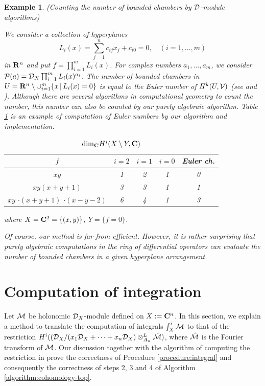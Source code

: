 \documentclass[12pt]{article}
\def\C{{\bf C}}
\def\R{ {\bf R}}
\def\Dsc{ {\cal D} }
\def\Msc{ {\cal M} }
\def\Psc{ {\cal P} }
\def\Vsc{ {\cal V} }
\newtheorem{example}{Example}[section]
\begin{document}
\begin{example} \rm 
(Counting the number of bounded chambers by $\Dsc$-module algorithms)

We consider a collection of hyperplanes
$$ L_i(x) = \sum_{j=1}^n c_{ij} x_j + c_{i0} = 0, \quad (i=1, \ldots, m)$$
in $\R^n$ and put $f = \prod_{i=1}^m L_i(x)$.
For complex numbers $a_1, \ldots, a_m$, we consider
$ \Psc(a) = \Dsc_X \prod_{i=1}^m L_i(x)^{a_i} $.
The number of bounded chambers in 
$U = \R^n \setminus \cup_{i=1}^m \{ x \,|\, L_i(x) = 0 \}$
is equal to the Euler number of $H^k(U,\Vsc)$ 
(see \cite[p.47 Theorem 2.13.1]{Aomoto-Kita} and \cite{Orlik-Terao}).
Although there are several algorithms in computational geometry
to count the number,
this number can also be counted by our purely algebraic algorithm.
Table \ref{table:1} is an example of computation of Euler numbers 
by our algorithm and implementation.

\begin{table}[htb]
\caption{${\rm dim}_\C H^i(X\setminus Y, \C)$}
\label{table:1}
\begin{center}
\begin{tabular}{|c|c|c|c|c|}\hline
$f$ & $i=2$ & $i=1$ & $i=0$ & Euler ch. \\ \hline\hline
$xy$               & 1 & 2 & 1 & 0 \\ \hline
$xy(x+y+1)$        & 3 & 3 & 1 & 1 \\ \hline
\parbox{38mm}{$xy$\\$\cdot(x+y+1)$\\$\cdot(x-y-2)$} 
                   & 6 & 4 & 1 & 3 \\ \hline
\end{tabular}
\end{center}
where
$X = \C^2 = \{(x,y)\}$, $Y=\{f=0\}$.
\end{table}

Of course, our method is far from efficient.
However, it is rather surprising that purely algebraic 
computations in the ring of differential operators can 
evaluate the number of bounded chambers in a given hyperplane arrangement.
\end{example}


\section{Computation of integration}
\setcounter{equation}{0}
\label{section:integration}

Let $\Msc$ be holonomic $\Dsc_X$-module defined on $X := \C^n$.
In this section, we explain a method to
translate the computation of integrals
$\int^i_X \Msc$  to that of the restriction
$ H^i((\Dsc_X/(x_1 \Dsc_X + \cdots + x_n \Dsc_X) \otimes_{A_n}^L {\hat \Msc})$,
where $\hat \Msc$ is the Fourier transform of $\Msc$.  
Our discussion together with the algorithm of computing
the restriction in \cite{OakuAdvance2} prove 
the correctness of 
Procedure \ref{procedure:integral}
and consequently the correctness of steps 2, 3 and 4 of
Algorithm \ref{algorithm:cohomology-top}.
\end{document}
